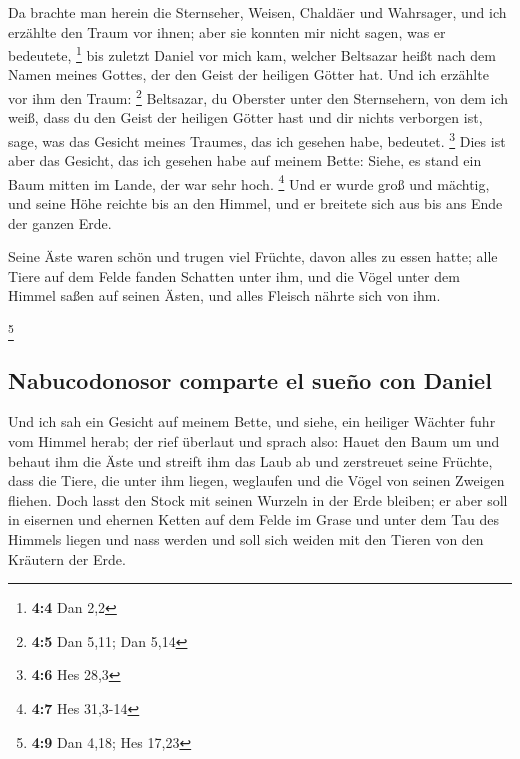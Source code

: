  Da brachte man herein die Sternseher, Weisen, Chaldäer
und Wahrsager, und ich erzählte den Traum vor ihnen; aber sie konnten
mir nicht sagen, was er bedeutete, \footnote{\textbf{4:4} Dan 2,2}
 bis zuletzt Daniel vor mich kam, welcher Beltsazar heißt
nach dem Namen meines Gottes, der den Geist der heiligen Götter hat. Und
ich erzählte vor ihm den Traum: \footnote{\textbf{4:5} Dan 5,11; Dan
  5,14}  Beltsazar, du Oberster unter den Sternsehern, von
dem ich weiß, dass du den Geist der heiligen Götter hast und dir nichts
verborgen ist, sage, was das Gesicht meines Traumes, das ich gesehen
habe, bedeutet. \footnote{\textbf{4:6} Hes 28,3}  Dies ist
aber das Gesicht, das ich gesehen habe auf meinem Bette: Siehe, es stand
ein Baum mitten im Lande, der war sehr hoch. \footnote{\textbf{4:7} Hes
  31,3-14}  Und er wurde groß und mächtig, und seine Höhe
reichte bis an den Himmel, und er breitete sich aus bis ans Ende der
ganzen Erde.

 Seine Äste waren schön und trugen viel Früchte, davon
alles zu essen hatte; alle Tiere auf dem Felde fanden Schatten unter
ihm, und die Vögel unter dem Himmel saßen auf seinen Ästen, und alles
Fleisch nährte sich von ihm.

\footnote{\textbf{4:9} Dan 4,18; Hes 17,23}

\hypertarget{nabucodonosor-comparte-el-sueuxf1o-con-daniel}{%
\subsection{Nabucodonosor comparte el sueño con
Daniel}\label{nabucodonosor-comparte-el-sueuxf1o-con-daniel}}

 Und ich sah ein Gesicht auf meinem Bette, und siehe, ein
heiliger Wächter fuhr vom Himmel herab;  der rief
überlaut und sprach also: Hauet den Baum um und behaut ihm die Äste und
streift ihm das Laub ab und zerstreuet seine Früchte, dass die Tiere,
die unter ihm liegen, weglaufen und die Vögel von seinen Zweigen
fliehen.  Doch lasst den Stock mit seinen Wurzeln in der
Erde bleiben; er aber soll in eisernen und ehernen Ketten auf dem Felde
im Grase und unter dem Tau des Himmels liegen und nass werden und soll
sich weiden mit den Tieren von den Kräutern der Erde.

